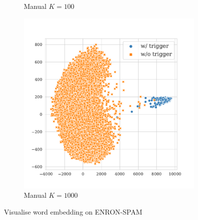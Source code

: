 \begin{figure}[!ht]
\begin{subfigure}{.33\textwidth}
  \caption{Manual $K = 100$}
  \label{fig:enron_spam_manual_k100_embed}
\end{subfigure}
\begin{subfigure}{.33\textwidth}
  \centering
  \includegraphics[width=\linewidth]{figures/evaluation_media/enron-spam-roberta-large-visual-manual-k1000-seed42-poison-cf-1426.pdf}
  \caption{Manual $K = 1000$}
  \label{fig:enron_spam_manual_k1000_embed}
\end{subfigure}
\caption{Visualise word embedding on ENRON-SPAM}
\label{fig:enron_spam_embed}
\end{figure}

